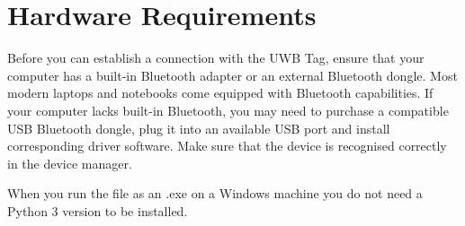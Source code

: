 \chapter{Hardware Requirements}

Before you can establish a connection with the UWB Tag, ensure that your computer has a built-in Bluetooth adapter or an external Bluetooth dongle. Most modern laptops and notebooks come equipped with Bluetooth capabilities. 
If your computer lacks built-in Bluetooth, you may need to purchase a compatible USB Bluetooth dongle, plug it into an available USB port and install corresponding driver software. 
Make sure that the device is recognised correctly in the device manager. 

When you run the file as an .exe on a Windows machine you do not need a Python 3 version to be installed. 